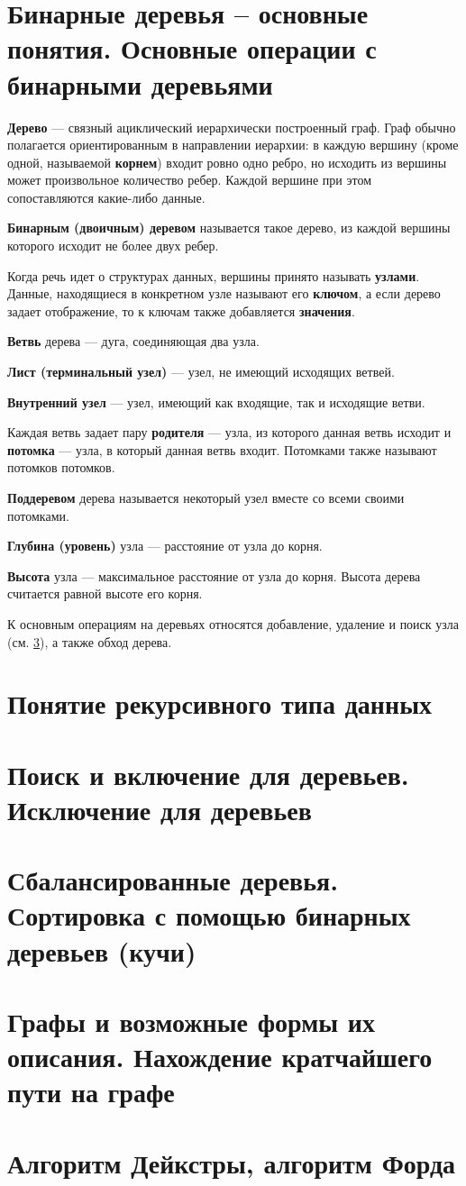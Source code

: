 \section{Бинарные деревья – основные понятия. Основные операции с бинарными деревьями}
\textbf{Дерево} --- связный ациклический иерархически построенный граф. Граф обычно
полагается ориентированным в направлении иерархии: в каждую вершину (кроме одной,
называемой \textbf{корнем}) входит ровно одно ребро, но исходить из вершины может
произвольное количество ребер. Каждой вершине при этом сопоставляются какие-либо данные.

\textbf{Бинарным (двоичным) деревом} называется такое дерево, из каждой вершины которого
исходит не более двух ребер.

Когда речь идет о структурах данных, вершины принято называть \textbf{узлами}.
Данные, находящиеся в конкретном узле называют его \textbf{ключом}, а если дерево задает
отображение, то к ключам также добавляется \textbf{значения}.

\textbf{Ветвь} дерева --- дуга, соединяющая два узла. 

\textbf{Лист (терминальный узел)} --- узел, не имеющий исходящих ветвей.

\textbf{Внутренний узел} --- узел, имеющий как входящие, так и исходящие ветви.

Каждая ветвь задает пару \textbf{родителя} --- узла, из которого данная ветвь исходит
и \textbf{потомка} --- узла, в который данная ветвь входит. Потомками также называют
потомков потомков.

\textbf{Поддеревом} дерева называется некоторый узел вместе со всеми своими потомками.

\textbf{Глубина (уровень)} узла --- расстояние от узла до корня.

\textbf{Высота} узла --- максимальное расстояние от узла до корня. Высота дерева считается
равной высоте его корня.

К основным операциям на деревьях относятся добавление, удаление и поиск узла (см. \ref{sec:tree-node-ops}), а также обход дерева.

\section{Понятие рекурсивного типа данных}
\section{Поиск и включение для деревьев. Исключение для деревьев}
\label{sec:tree-node-ops}
\section{Сбалансированные деревья. Сортировка с помощью бинарных деревьев (кучи)}
\section{Графы и возможные формы их описания. Нахождение кратчайшего пути на графе}
\section{Алгоритм Дейкстры, алгоритм Форда}
